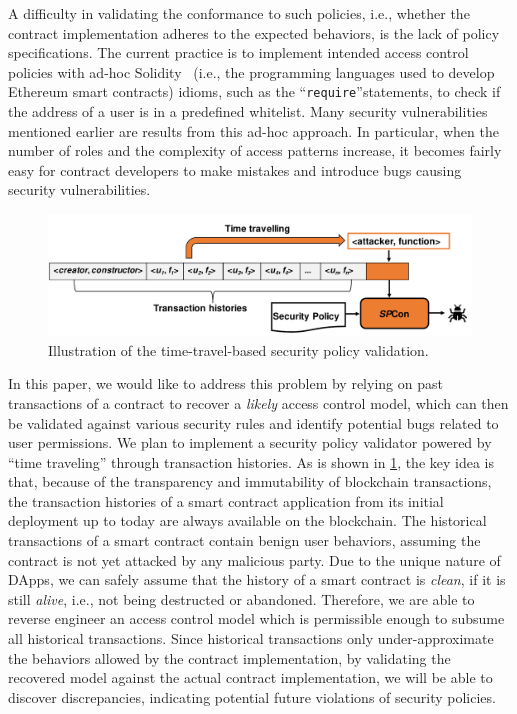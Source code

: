 A difficulty in validating the conformance to such policies, i.e., whether the contract
implementation adheres to the expected behaviors, is the lack of policy specifications. The
current practice is to implement intended access control policies with ad-hoc
Solidity~\cite{solidity} (i.e., the programming languages used to develop Ethereum smart contracts)
idioms, such as the ``\texttt{require}''statements, to check if the address of a user is in a
predefined whitelist.
Many security vulnerabilities mentioned earlier are results from this ad-hoc approach.
In particular, when the number of roles and the complexity of access patterns increase, it becomes
fairly easy for contract developers to make mistakes and introduce bugs causing security
vulnerabilities.

\begin{figure}[t]
	\centering
	\includegraphics[width=\linewidth]{Figures/Chapter4/SPconIllustration-crop.pdf}
	\caption{Illustration of the time-travel-based security policy validation.}
	\label{fig:time-travel}
\end{figure}

In this paper, we would like to address this problem by relying on past transactions of a contract
to recover a \emph{likely} access control model, which can then be validated against various
security rules and identify potential bugs related to user permissions.
We plan to implement a security policy validator powered by ``time traveling'' through transaction
histories.
As is shown in \cref{fig:time-travel}, the key idea is that, because of the transparency and
immutability of blockchain transactions, the transaction histories of a smart contract application
from its initial deployment up to today are always available on the blockchain.
The historical transactions of a smart contract contain benign user behaviors, assuming the
contract is not yet attacked by any malicious party.
Due to the unique nature of DApps, we can safely assume that the history of a smart contract is
\emph{clean}, if it is still \emph{alive}, i.e., not being destructed or abandoned.
Therefore, we are able to reverse engineer an access control model which is permissible enough to
subsume all historical transactions.
Since historical transactions only under-approximate the behaviors allowed by the contract
implementation, by validating the recovered model against the actual contract implementation, we
will be able to discover discrepancies, indicating potential future violations of security policies.